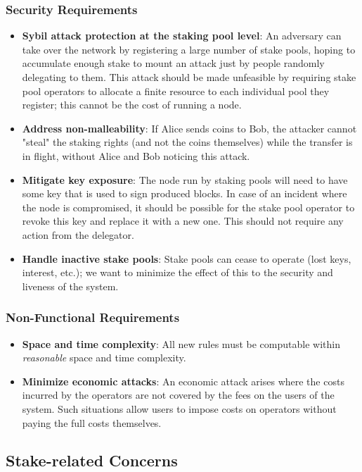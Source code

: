\subsubsection{Security Requirements}
\begin{itemize}
    \item \textbf{Sybil attack protection at the staking pool level}: An adversary can take over the network by registering a large number of stake pools, hoping to accumulate enough stake to mount an attack just by people randomly delegating to them. This attack should be made unfeasible by requiring stake pool operators to allocate a finite resource to each individual pool they register; this cannot be the cost of running a node.
    \item \textbf{Address non-malleability}: If Alice sends coins to Bob, the attacker cannot "steal" the staking rights (and not the coins themselves) while the transfer is in flight, without Alice and Bob noticing this attack.  
    \item \textbf{Mitigate key exposure}: The node run by staking pools will need to have some key that is used to sign produced blocks. In case of an incident where the node is compromised, it should be possible for the stake pool operator to revoke this key and replace it with a new one. This should not require any action from the delegator. 
    \item \textbf{Handle inactive stake pools}: Stake pools can cease to operate (lost keys, interest, etc.); we want to minimize the effect of this to the security and liveness of the system. 
\end{itemize}

\subsubsection{Non-Functional Requirements}
\begin{itemize}
    \item \textbf{Space and time complexity}: All new rules must be computable within \textit{reasonable} space and time complexity. 
    \item \textbf{Minimize economic attacks}: An economic attack arises where the costs incurred by the operators are not covered by the fees on the users of the system. Such situations allow users to impose costs on operators without paying the full costs themselves. 
\end{itemize}

\subsection{Stake-related Concerns} \label{stake_concerns}

